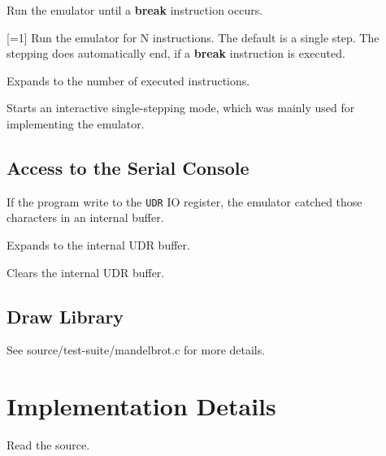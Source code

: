 \documentclass{article}
\begin{document}
\DescribeMacro{\avrrun}
Run the emulator until a \textbf{break} instruction occurs.

\DescribeMacro{\avrstep}[=1]
Run the emulator for N instructions. The default is a single step. The stepping does automatically
end, if a \textbf{break} instruction is executed.

\DescribeMacro{\avrinstrcount}
Expands to the number of executed instructions.

\DescribeMacro{\avrsinglestep}
Starts an interactive single-stepping mode, which was mainly used for implementing the emulator.


\subsection{Access to the Serial Console}
If the program write to the \verb|UDR| IO register, the emulator catched those characters in an
internal buffer.

\DescribeMacro{\avrUDR}
Expands to the internal UDR buffer.

\DescribeMacro{\avrUDRclear}
Clears the internal UDR buffer.

\subsection{Draw Library}

See source/test-suite/mandelbrot.c for more details.

\section{Implementation Details}
Read the source.
\end{document}
